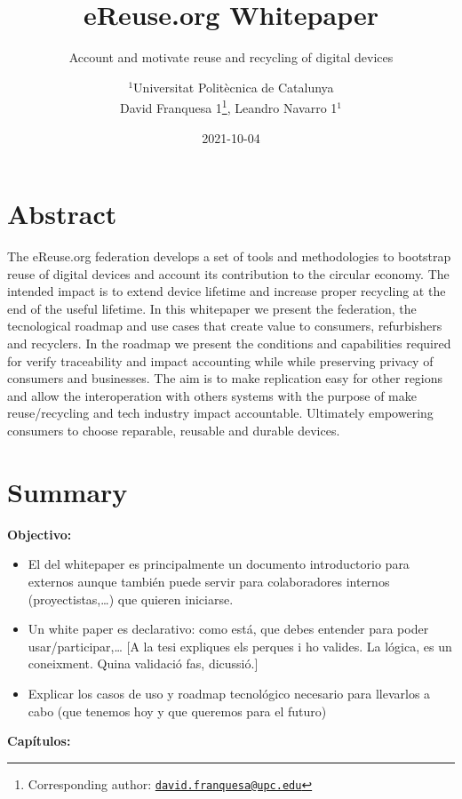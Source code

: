 \documentclass[
]{book}
\title{eReuse.org Whitepaper}
\subtitle{Account and motivate reuse and recycling of digital devices}
\author{\(^1\)Universitat Politècnica de Catalunya\\
David Franquesa 1\footnote{Corresponding author: \href{mailto:david.franquesa@upc.edu}{\nolinkurl{david.franquesa@upc.edu}}}, Leandro Navarro 1\(^1\)}
\date{2021-10-04}
\begin{document}
\maketitle

{
\setcounter{tocdepth}{1}
\tableofcontents
}
\hypertarget{abstract}{%
\chapter*{Abstract}\label{abstract}}

The eReuse.org federation develops a set of tools and methodologies to bootstrap reuse of digital devices and account its contribution to the circular economy. The intended impact is to extend device lifetime and increase proper recycling at the end of the useful lifetime. In this whitepaper we present the federation, the tecnological roadmap and use cases that create value to consumers, refurbishers and recyclers. In the roadmap we present the conditions and capabilities required for verify traceability and impact accounting while while preserving privacy of consumers and businesses. The aim is to make replication easy for other regions and allow the interoperation with others systems with the purpose of make reuse/recycling and tech industry impact accountable. Ultimately empowering consumers to choose reparable, reusable and durable devices.

\hypertarget{summary}{%
\chapter{Summary}\label{summary}}

\textbf{Objectivo: }

\begin{itemize}
\item
  El del whitepaper es principalmente un documento introductorio para externos aunque también puede servir para colaboradores internos (proyectistas,\ldots) que quieren iniciarse.
\item
  Un white paper es declarativo: como está, que debes entender para poder usar/participar,\ldots{} {[}A la tesi expliques els perques i ho valides. La lógica, es un coneixment. Quina validació fas, dicussió.{]}
\item
  Explicar los casos de uso y roadmap tecnológico necesario para llevarlos a cabo (que tenemos hoy y que queremos para el futuro)
\end{itemize}

\textbf{Capítulos:}
\end{document}
